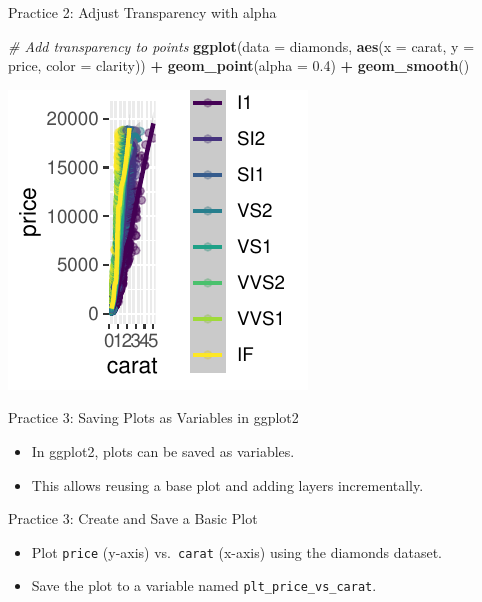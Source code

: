 \documentclass[
  ignorenonframetext,
]{beamer}
\newenvironment{Shaded}{\begin{snugshade}}{\end{snugshade}}
\newcommand{\AttributeTok}[1]{\textcolor[rgb]{0.13,0.29,0.53}{#1}}
\newcommand{\CommentTok}[1]{\textcolor[rgb]{0.56,0.35,0.01}{\textit{#1}}}
\newcommand{\FloatTok}[1]{\textcolor[rgb]{0.00,0.00,0.81}{#1}}
\newcommand{\FunctionTok}[1]{\textcolor[rgb]{0.13,0.29,0.53}{\textbf{#1}}}
\newcommand{\NormalTok}[1]{#1}
\newcommand{\SpecialCharTok}[1]{\textcolor[rgb]{0.81,0.36,0.00}{\textbf{#1}}}
\providecommand{\tightlist}{%
  \setlength{\itemsep}{0pt}\setlength{\parskip}{0pt}}
\begin{document}
\begin{frame}[fragile]{Practice 2: Adjust Transparency with alpha}
\label{practice-2-adjust-transparency-with-alpha-1}

\begin{Shaded}
\begin{Highlighting}[]
\CommentTok{\# Add transparency to points}
\FunctionTok{ggplot}\NormalTok{(}\AttributeTok{data =}\NormalTok{ diamonds, }\FunctionTok{aes}\NormalTok{(}\AttributeTok{x =}\NormalTok{ carat, }\AttributeTok{y =}\NormalTok{ price, }\AttributeTok{color =}\NormalTok{ clarity)) }\SpecialCharTok{+}
    \FunctionTok{geom\_point}\NormalTok{(}\AttributeTok{alpha =} \FloatTok{0.4}\NormalTok{) }\SpecialCharTok{+} \FunctionTok{geom\_smooth}\NormalTok{()}
\end{Highlighting}
\end{Shaded}

\begin{center}\includegraphics[width=0.5\linewidth]{Figs/unnamed-chunk-6-1} \end{center}
\end{frame}

\begin{frame}{Practice 3: Saving Plots as Variables in ggplot2}
\label{practice-3-saving-plots-as-variables-in-ggplot2}
\begin{itemize}
\tightlist
\item
  In ggplot2, plots can be saved as variables.
\item
  This allows reusing a base plot and adding layers incrementally.
\end{itemize}
\end{frame}

\begin{frame}[fragile]{Practice 3: Create and Save a Basic Plot}
\label{practice-3-create-and-save-a-basic-plot}
\begin{itemize}
\tightlist
\item
  Plot \texttt{price} (y-axis) vs.~\texttt{carat} (x-axis) using the
  diamonds dataset.
\item
  Save the plot to a variable named \texttt{plt\_price\_vs\_carat}.
\end{itemize}
\end{frame}
\end{document}
